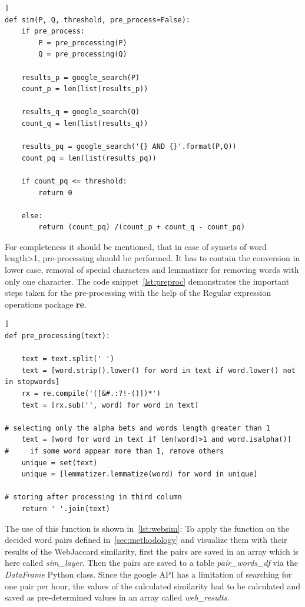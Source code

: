 \documentclass[conference]{IEEEtran}
\begin{document}
\begin{lstlisting}[frame=single, label=lst:hpq, caption={Getting google results and calculation of WebJaccard similarity}, captionpos=b]]
def sim(P, Q, threshold, pre_process=False):
    if pre_process:
        P = pre_processing(P)
        Q = pre_processing(Q)

    results_p = google_search(P)
    count_p = len(list(results_p))

    results_q = google_search(Q)
    count_q = len(list(results_q))
    
    results_pq = google_search('{} AND {}'.format(P,Q))
    count_pq = len(list(results_pq))
    
    if count_pq <= threshold:
        return 0
    
    else:
        return (count_pq) /(count_p + count_q - count_pq)
\end{lstlisting}

For completeness it should be mentioned, that in case of synsets of word length>1,  pre-processing should be performed. It has to contain the conversion in lower case, removal of special characters and lemmatizer for removing words with only one character. The code snippet~\ref{lst:preproc} demonstrates the important steps taken for the pre-processing with the help of the Regular expression operations package \textbf{re}.

\begin{lstlisting}[frame=single, label=lst:preproc, caption={Pre-processing for synsets of word length>1}, captionpos=b]]
def pre_processing(text):

    text = text.split(' ')
    text = [word.strip().lower() for word in text if word.lower() not in stopwords]
    rx = re.compile('([&#.:?!-()])*')
    text = [rx.sub('', word) for word in text]
    
# selecting only the alpha bets and words length greater than 1
    text = [word for word in text if len(word)>1 and word.isalpha()]
#     if some word appear more than 1, remove others
    unique = set(text)
    unique = [lemmatizer.lemmatize(word) for word in unique]
    
# storing after processing in third column
    return ' '.join(text)
\end{lstlisting}

The use of this function is shown in~\ref{lst:websim}: To apply the function on the decided word pairs defined in~\ref{sec:methodology} and visualize them with their results of the WebJaccard similarity, first the pairs are saved in an array which is here called \textit{sim\_layer}. Then the pairs are saved to a table \textit{pair\_words\_df} via the \textit{DataFrame} Python class. Since the google API has a limitation of searching for one pair per hour, the values of the calculated similarity had to be calculated and saved as pre-determined values in an array called \textit{web\_results}.
\end{document}
